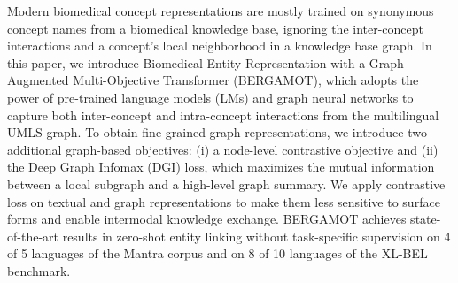 Modern biomedical concept representations are mostly trained on synonymous concept names from a biomedical knowledge base, ignoring the inter-concept interactions and a concept's local neighborhood in a knowledge base graph. In this paper, we introduce Biomedical Entity Representation with a Graph-Augmented Multi-Objective Transformer (BERGAMOT), which adopts the power of pre-trained language models (LMs) and graph neural networks to capture both inter-concept and intra-concept interactions from the multilingual UMLS graph. To obtain fine-grained graph representations, we introduce two additional graph-based objectives: (i) a node-level contrastive objective and (ii) the Deep Graph Infomax (DGI) loss, which maximizes the mutual information between a local subgraph and a high-level graph summary. We apply contrastive loss on textual and graph representations to make them less sensitive to surface forms and enable intermodal knowledge exchange. BERGAMOT achieves state-of-the-art results in zero-shot entity linking without task-specific supervision on 4 of 5 languages of the Mantra corpus and on 8 of 10 languages of the XL-BEL benchmark.